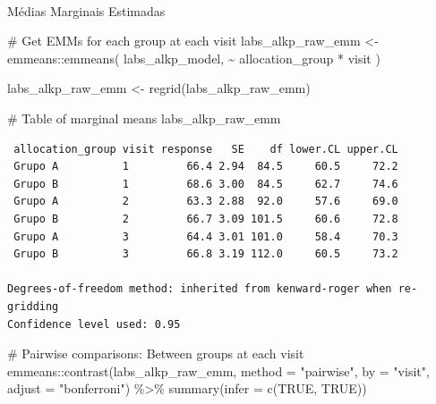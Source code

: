 \documentclass[
  letterpaper,
  DIV=11,
  numbers=noendperiod]{scrartcl}
\makeatletter
\let\oldparagraph\paragraph
\renewcommand{\paragraph}{
    \@ifstar
      \xxxParagraphStar
      \xxxParagraphNoStar
  }
\newcommand{\xxxParagraphStar}[1]{\oldparagraph*{#1}\mbox{}}
\newcommand{\xxxParagraphNoStar}[1]{\oldparagraph{#1}\mbox{}}
\newenvironment{Shaded}{\begin{snugshade}}{\end{snugshade}}
\newcommand{\AttributeTok}[1]{\textcolor[rgb]{0.40,0.45,0.13}{#1}}
\newcommand{\CommentTok}[1]{\textcolor[rgb]{0.37,0.37,0.37}{#1}}
\newcommand{\ConstantTok}[1]{\textcolor[rgb]{0.56,0.35,0.01}{#1}}
\newcommand{\FunctionTok}[1]{\textcolor[rgb]{0.28,0.35,0.67}{#1}}
\newcommand{\NormalTok}[1]{\textcolor[rgb]{0.00,0.23,0.31}{#1}}
\newcommand{\OtherTok}[1]{\textcolor[rgb]{0.00,0.23,0.31}{#1}}
\newcommand{\SpecialCharTok}[1]{\textcolor[rgb]{0.37,0.37,0.37}{#1}}
\newcommand{\StringTok}[1]{\textcolor[rgb]{0.13,0.47,0.30}{#1}}
\makeatother
\begin{document}
\paragraph{Médias Marginais
Estimadas}\label{muxe9dias-marginais-estimadas-3}

\begin{Shaded}
\begin{Highlighting}[]
\CommentTok{\# Get EMMs for each group at each visit}
\NormalTok{labs\_alkp\_raw\_emm }\OtherTok{\textless{}{-}}\NormalTok{ emmeans}\SpecialCharTok{::}\FunctionTok{emmeans}\NormalTok{(}
\NormalTok{    labs\_alkp\_model, }
    \SpecialCharTok{\textasciitilde{}}\NormalTok{ allocation\_group }\SpecialCharTok{*}\NormalTok{ visit}
\NormalTok{)}

\NormalTok{labs\_alkp\_raw\_emm }\OtherTok{\textless{}{-}} \FunctionTok{regrid}\NormalTok{(labs\_alkp\_raw\_emm)}

\CommentTok{\# Table of marginal means}
\NormalTok{labs\_alkp\_raw\_emm}
\end{Highlighting}
\end{Shaded}

\begin{verbatim}
 allocation_group visit response   SE    df lower.CL upper.CL
 Grupo A          1         66.4 2.94  84.5     60.5     72.2
 Grupo B          1         68.6 3.00  84.5     62.7     74.6
 Grupo A          2         63.3 2.88  92.0     57.6     69.0
 Grupo B          2         66.7 3.09 101.5     60.6     72.8
 Grupo A          3         64.4 3.01 101.0     58.4     70.3
 Grupo B          3         66.8 3.19 112.0     60.5     73.2

Degrees-of-freedom method: inherited from kenward-roger when re-gridding 
Confidence level used: 0.95 
\end{verbatim}

\begin{Shaded}
\begin{Highlighting}[]
\CommentTok{\# Pairwise comparisons: Between groups at each visit}
\NormalTok{emmeans}\SpecialCharTok{::}\FunctionTok{contrast}\NormalTok{(labs\_alkp\_raw\_emm, }\AttributeTok{method =} \StringTok{"pairwise"}\NormalTok{, }\AttributeTok{by =} \StringTok{"visit"}\NormalTok{, }\AttributeTok{adjust =} \StringTok{"bonferroni"}\NormalTok{) }\SpecialCharTok{\%\textgreater{}\%} \FunctionTok{summary}\NormalTok{(}\AttributeTok{infer =} \FunctionTok{c}\NormalTok{(}\ConstantTok{TRUE}\NormalTok{, }\ConstantTok{TRUE}\NormalTok{))}
\end{Highlighting}
\end{Shaded}
\end{document}
